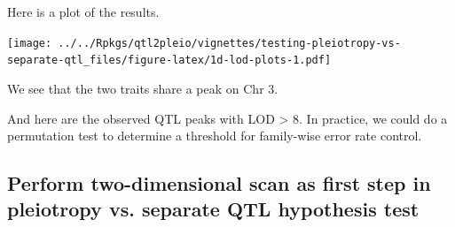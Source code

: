 \documentclass[oneside]{book}\usepackage[]{graphicx}\usepackage[]{color}
\newenvironment{Shaded}{\begin{snugshade}}{\end{snugshade}}
\newcommand{\CommentTok}[1]{\textcolor[rgb]{0.56,0.35,0.01}{\textit{#1}}}
\newcommand{\DataTypeTok}[1]{\textcolor[rgb]{0.13,0.29,0.53}{#1}}
\newcommand{\DecValTok}[1]{\textcolor[rgb]{0.00,0.00,0.81}{#1}}
\newcommand{\KeywordTok}[1]{\textcolor[rgb]{0.13,0.29,0.53}{\textbf{#1}}}
\newcommand{\NormalTok}[1]{#1}
\newcommand{\OperatorTok}[1]{\textcolor[rgb]{0.81,0.36,0.00}{\textbf{#1}}}
\newcommand{\OtherTok}[1]{\textcolor[rgb]{0.56,0.35,0.01}{#1}}
\newcommand{\StringTok}[1]{\textcolor[rgb]{0.31,0.60,0.02}{#1}}
\begin{document}
Here is a plot of the results.

\begin{Shaded}
\end{Shaded}

\texttt{[image: ../../Rpkgs/qtl2pleio/vignettes/testing-pleiotropy-vs-separate-qtl\_files/figure-latex/1d-lod-plots-1.pdf]}

We see that the two traits share a peak on Chr 3.

And here are the observed QTL peaks with LOD \textgreater{} 8. In
practice, we could do a permutation test to determine a threshold for
family-wise error rate control.

\begin{Shaded}
\end{Shaded}

\hypertarget{perform-two-dimensional-scan-as-first-step-in-pleiotropy-vs.-separate-qtl-hypothesis-test}{%
\subsection{Perform two-dimensional scan as first step in pleiotropy vs.
separate QTL hypothesis
test}\label{perform-two-dimensional-scan-as-first-step-in-pleiotropy-vs.-separate-qtl-hypothesis-test}}
\end{document}
